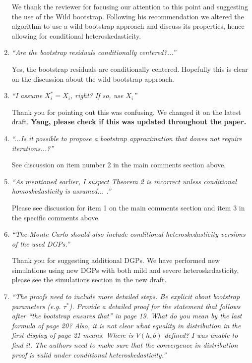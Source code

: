 \documentclass[12pt,fleqn]{article}
\begin{document}
\begin{enumerate}
 We thank the reviewer for focusing our attention to this point and suggesting the use of the Wild bootstrap. Following his recommendation we altered the algorithm to use a wild bootstrap approach and discuss its properties, hence allowing for conditional heteroskedasticity.

\item \textit{``Are the bootstrap residuals conditionally centered?...''}

 Yes, the bootstrap residuals are conditionally centered. Hopefully this is clear on the discussion about the wild bootstrap approach.

\item \textit{``I assume $X_{i}^{*}=X_{i}$, right? If so, use $X_{i}$''}

Thank you for pointing out this was confusing. We changed it on the latest draft. \textbf{Yang, please check if this was updated throughout the paper.}

\item \textit{``...Is it possible to propose a bootstrap approximation that dowes not require iterations...?''}

 See discussion on item number 2 in the main comments section above.

\item \textit{``As mentioned earlier, I suspect Theorem 2 is incorrect unless conditional homoskedasticity is assumed... .''}

  Please see discussion for item 1 on the main comments section and item 3 in the specific comments above.

\item \textit{``The Monte Carlo should also include conditional heteroskedasticity versions of the used DGPs.''}

  Thank you for suggesting additional DGPs. We have performed new simulations using new DGPs with both mild and severe heteroskedasticity, please see the simulations section in the new draft.

\item \textit{``The proofs need to include more detailed steps. Be explicit about bootstrap parameters (e.g. $\tau^{*}$). Provide a detailed proof for the statement that follows after ``the bootstrap ensures that'' in page 19. What do you mean by the last formula of page 20? Also, it is not clear what equality in distribution in the first display of page 21 means. Where is $V(h,b)$ defined? I was unable to find it. The authors need to make sure that the convergence in distribution proof is valid under conditional heteroskedasticity.''}


\end{enumerate}
\end{document}
